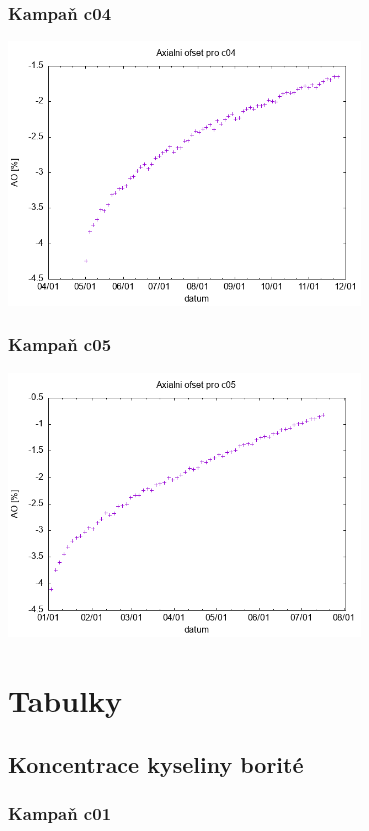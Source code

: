 \documentclass[a4paper,twoside,11pt]{article}
\begin{document}
\subsubsection{Kampaň c04}

\includegraphics[width=0.7\textwidth]{../plots/ao_c04}

\subsubsection{Kampaň c05}

\includegraphics[width=0.7\textwidth]{../plots/ao_c05}

\section{Tabulky}
\subsection{Koncentrace kyseliny borité}
\subsubsection{Kampaň c01}
\end{document}
